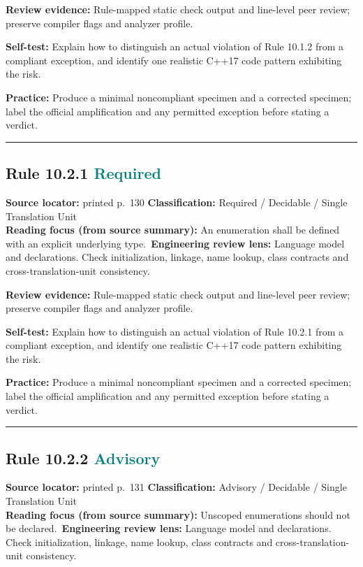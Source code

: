 \documentclass[10pt,letterpaper]{article}
\begin{document}
\textbf{Review evidence:} Rule-mapped static check output and line-level peer review; preserve compiler flags and analyzer profile.

\textbf{Self-test:} Explain how to distinguish an actual violation of Rule 10.1.2 from a compliant exception, and identify one realistic C++17 code pattern exhibiting the risk.\par
\textbf{Practice:} Produce a minimal noncompliant specimen and a corrected specimen; label the official amplification and any permitted exception before stating a verdict.
\smallskip\hrule\smallskip
\subsection*{Rule 10.2.1 \enspace \texorpdfstring{\small\textcolor{teal}{Required}}{Required}}
\noindent\textbf{Source locator:} printed p.~130 \quad\textbf{Classification:} Required / Decidable / Single Translation Unit\\
\textbf{Reading focus (from source summary):} An enumeration shall be defined with an explicit underlying type.\
\textbf{Engineering review lens:} Language model and declarations. Check initialization, linkage, name lookup, class contracts and cross-translation-unit consistency.

\textbf{Review evidence:} Rule-mapped static check output and line-level peer review; preserve compiler flags and analyzer profile.

\textbf{Self-test:} Explain how to distinguish an actual violation of Rule 10.2.1 from a compliant exception, and identify one realistic C++17 code pattern exhibiting the risk.\par
\textbf{Practice:} Produce a minimal noncompliant specimen and a corrected specimen; label the official amplification and any permitted exception before stating a verdict.
\smallskip\hrule\smallskip
\subsection*{Rule 10.2.2 \enspace \texorpdfstring{\small\textcolor{teal}{Advisory}}{Advisory}}
\noindent\textbf{Source locator:} printed p.~131 \quad\textbf{Classification:} Advisory / Decidable / Single Translation Unit\\
\textbf{Reading focus (from source summary):} Unscoped enumerations should not be declared.\
\textbf{Engineering review lens:} Language model and declarations. Check initialization, linkage, name lookup, class contracts and cross-translation-unit consistency.
\end{document}
